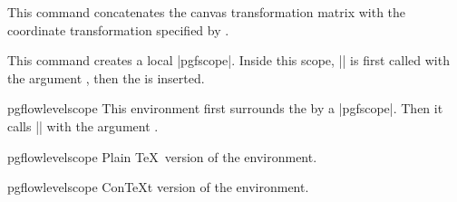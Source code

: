\begin{command}{\pgflowlevel{}}
  This command concatenates the canvas transformation matrix with the
  coordinate transformation specified by .

\begin{codeexample}[]
\end{codeexample}
\end{command}


\begin{command}{\pgflowlevelobj{}}
  This command creates a local |{pgfscope}|. Inside this scope,
  |\pgflowlevel| is first called with the argument
  , then the  is inserted. 

\begin{codeexample}[]
\end{codeexample}
\end{command}


\begin{environment}{{pgflowlevelscope}}
  This environment first surrounds the  by
  a |{pgfscope}|. Then it calls |\pgflowlevel| with the argument
  .

\begin{codeexample}[]
\end{codeexample}
\end{environment}


\begin{plainenvironment}{{pgflowlevelscope}}
  Plain \TeX\ version of the environment.
\end{plainenvironment}

\begin{contextenvironment}{{pgflowlevelscope}}
  Con\TeX t version of the environment.
\end{contextenvironment}




